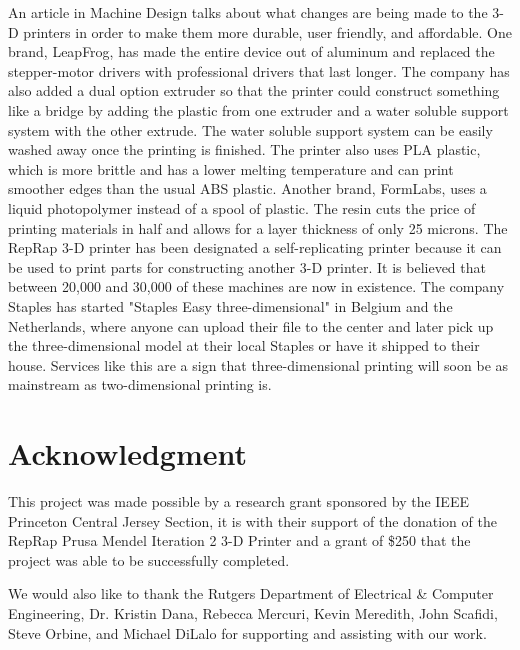 \documentclass[pdftex,10.5pt]{report}
\begin{document}
An article in Machine Design talks about what changes are being made to the 3-D printers in order to make them more durable, user friendly, and affordable. One brand, LeapFrog, has made the entire device out of aluminum and  replaced the stepper-motor drivers with professional drivers that last longer. The company has also added a dual option extruder so that the printer could construct something like a bridge by adding the plastic from one extruder and a water soluble support system with the other extrude. The water soluble support system can be easily washed away once the printing is finished. The printer also uses PLA plastic, which is more brittle and has a lower melting temperature and can print smoother edges than the usual ABS plastic. Another brand, FormLabs, uses a liquid photopolymer instead of a spool of plastic. The resin cuts the price of printing materials in half and allows for a layer thickness of only 25 microns. The RepRap 3-D printer has been designated a self-replicating printer because it can be used to print parts for constructing another 3-D printer. It is believed that between 20,000 and 30,000 of these machines are now in existence.\cite{cite7} The company Staples has started "Staples Easy three-dimensional" in Belgium and the Netherlands, where anyone can upload their file to the center and later pick up the three-dimensional model at their local Staples or have it shipped to their house. Services like this are a sign that three-dimensional printing will soon be as mainstream as two-dimensional printing is.

\section{Acknowledgment}
This project was made possible by a research grant sponsored by the IEEE Princeton Central Jersey Section, it is with their support of the donation of the RepRap Prusa Mendel Iteration 2 3-D Printer and a grant of \$250 that the project was able to be successfully completed.

We would also like to thank the Rutgers Department of Electrical \& Computer Engineering, Dr. Kristin Dana, Rebecca Mercuri, Kevin Meredith, John Scafidi, Steve Orbine, and Michael DiLalo for supporting and assisting with our work. 
\end{document}
